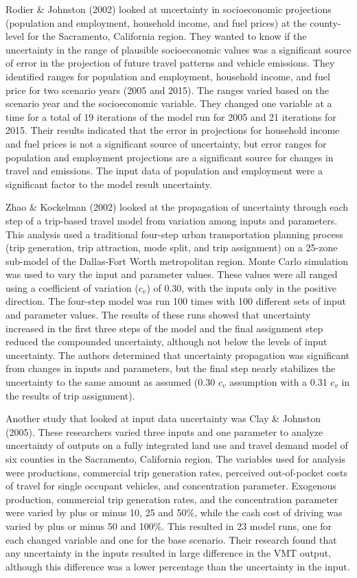 \documentclass[fancy, masters,twoside]{byuthesis}
\begin{document}
Rodier \& Johnston (2002) looked at uncertainty in socioeconomic projections (population and employment, household income, and fuel prices) at the county-level for the Sacramento, California region. They wanted to know if the uncertainty in the range of plausible socioeconomic values was a significant source of error in the projection of future travel patterns and vehicle emissions. They identified ranges for population and employment, household income, and fuel price for two scenario years (2005 and 2015). The ranges varied based on the scenario year and the socioeconomic variable. They changed one variable at a time for a total of 19 iterations of the model run for 2005 and 21 iterations for 2015. Their results indicated that the error in projections for household income and fuel prices is not a significant source of uncertainty, but error ranges for population and employment projections are a significant source for changes in travel and emissions. The input data of population and employment were a significant factor to the model result uncertainty.

Zhao \& Kockelman (2002) looked at the propagation of uncertainty through each step of a trip-based travel model from variation among inputs and parameters. This analysis used a traditional four-step urban transportation planning process (trip generation, trip attraction, mode split, and trip assignment) on a 25-zone sub-model of the Dallas-Fort Worth metropolitan region. Monte Carlo simulation was used to vary the input and parameter values. These values were all ranged using a coefficient of variation (\(c_v\)) of 0.30, with the inputs only in the positive direction. The four-step model was run 100 times with 100 different sets of input and parameter values. The results of these runs showed that uncertainty increased in the first three steps of the model and the final assignment step reduced the compounded uncertainty, although not below the levels of input uncertainty. The authors determined that uncertainty propagation was significant from changes in inputs and parameters, but the final step nearly stabilizes the uncertainty to the same amount as assumed (0.30 \(c_v\) assumption with a 0.31 \(c_v\) in the results of trip assignment).

Another study that looked at input data uncertainty was Clay \& Johnston (2005). These researchers varied three inputs and one parameter to analyze uncertainty of outputs on a fully integrated land use and travel demand model of six counties in the Sacramento, California region. The variables used for analysis were productions, commercial trip generation rates, perceived out-of-pocket costs of travel for single occupant vehicles, and concentration parameter. Exogenous production, commercial trip generation rates, and the concentration parameter were varied by plus or minus 10, 25 and 50\%, while the cash cost of driving was varied by plus or minus 50 and 100\%. This resulted in 23 model runs, one for each changed variable and one for the base scenario. Their research found that any uncertainty in the inputs resulted in large difference in the VMT output, although this difference was a lower percentage than the uncertainty in the input.
\end{document}
